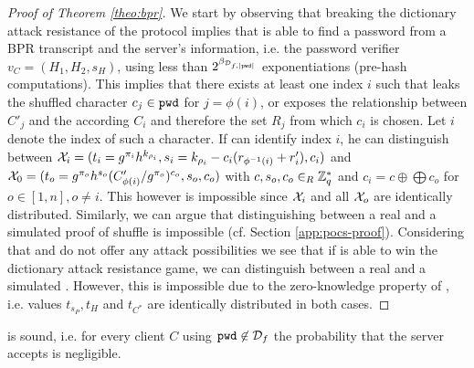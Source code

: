 \begin{proof}[Proof of Theorem \ref{theo:bpr}]
We start by observing that breaking the dictionary attack resistance of the protocol implies that \cA is able to find a password \pwd from a BPR transcript and the server's information, i.e. the password verifier $v_C=(H_1,H_2,s_H)$, using less than $2^{\beta_{\mathcal{D}_{f,|\mathtt{pwd}|}}}$ exponentiations (pre-hash computations).
This implies that there exists at least one index $i$ such that \PoM leaks the shuffled character $c_j\in\mathtt{pwd}$ for $j=\phi(i)$, or \PoS exposes the relationship between $C'_j$ and the according $C_i$ and therefore the set $R_j$ from which $c_i$ is chosen.
Let $i$ denote the index of such a character.
If \cA can identify index $i$, he can distinguish between $\mathcal{X}_i=(t_i=g^{\pi_i}h^{k_{\rho_i}}, s_i=k_{\rho_i}-c_i(r_{\phi^{-1}(i)}+r'_i), c_i)$ and $\mathcal{X}_0=(t_o=g^{\pi_o}h^{s_o}(C'_{\phi(i)}/g^{\pi_o})^{c_o}, s_o, c_o)$ with $c,s_o,c_o\in_R\mathbb{Z}^\ast_q$ and $c_i=c\oplus \bigoplus c_o$ for $o\in[1,n], o\not=i$.
This however is impossible since $\mathcal{X}_i$ and all $\mathcal{X}_o$ are identically distributed.
Similarly, we can argue that distinguishing between a real and a simulated proof of shuffle is impossible (cf. Section \ref{app:pocs-proof}).
Considering that \PoM and \PoS do not offer any attack possibilities we see that if \cA is able to win the dictionary attack resistance game, we can distinguish between a real and a simulated \PoE.
However, this is impossible due to the zero-knowledge property of \PoE, i.e. values $t_{s_P}, t_H$ and $t_{C^\ast}$ are identically distributed in both cases.


\end{proof}

\begin{claim}
  \PoM is sound, i.e. for every client $C$ using $\mathtt{pwd}\not\in\mathcal{D}_f$ the probability that the server accepts \PoM is negligible.
\end{claim}

